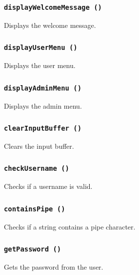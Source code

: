 \documentclass[12pt,a4paper]{report}
\begin{document}
\subsubsection{\texttt{displayWelcomeMessage ()}}
Displays the welcome message.


\subsubsection{\texttt{displayUserMenu ()}}
Displays the user menu.


\subsubsection{\texttt{displayAdminMenu ()}}
Displays the admin menu.


\subsubsection{\texttt{clearInputBuffer ()}}
Clears the input buffer.


\subsubsection{\texttt{checkUsername ()}}
Checks if a username is valid.


\subsubsection{\texttt{containsPipe ()}}
Checks if a string contains a pipe character.


\subsubsection{\texttt{getPassword ()}}
Gets the password from the user.

\end{document}

